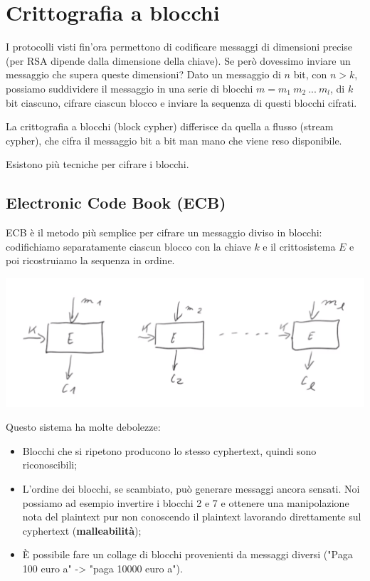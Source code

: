 \setchapterpreamble[u]{\margintoc}
\chapter{Crittografia a blocchi}

I protocolli visti fin'ora permettono di codificare messaggi di dimensioni precise (per RSA dipende dalla dimensione della chiave). Se però dovessimo inviare un messaggio che supera queste dimensioni? Dato un messaggio di $n$ bit, con $n > k$, possiamo suddividere il messaggio in una serie di blocchi $m = m_1 \ m_2 \ ... \ m_l$, di $k$ bit ciascuno, cifrare ciascun blocco e inviare la sequenza di questi blocchi cifrati. 

La crittografia a blocchi (block cypher) differisce da quella  a flusso (stream cypher), che cifra il messaggio bit a bit man mano che viene reso disponibile.

Esistono più tecniche per cifrare i blocchi.

\section{Electronic Code Book (ECB)}

ECB è il metodo più semplice per cifrare un messaggio diviso in blocchi: codifichiamo separatamente ciascun blocco con la chiave $k$ e il crittosistema $E$ e poi ricostruiamo la sequenza in ordine.

\begin{center}
    \includegraphics[width=1\textwidth]{images/ECB.png}
\end{center}

\noindent Questo sistema ha molte debolezze:
\begin{itemize}
    \item Blocchi che si ripetono producono lo stesso cyphertext, quindi sono riconoscibili;
    \item L'ordine dei blocchi, se scambiato, può generare messaggi ancora sensati. Noi possiamo ad esempio invertire i blocchi 2 e 7 e ottenere una manipolazione nota del plaintext pur non conoscendo il plaintext lavorando direttamente sul cyphertext (\textbf{malleabilità});
    \item È possibile fare un collage di blocchi provenienti da messaggi diversi ("Paga 100 euro a" -> "paga 10000 euro a").
\end{itemize}

